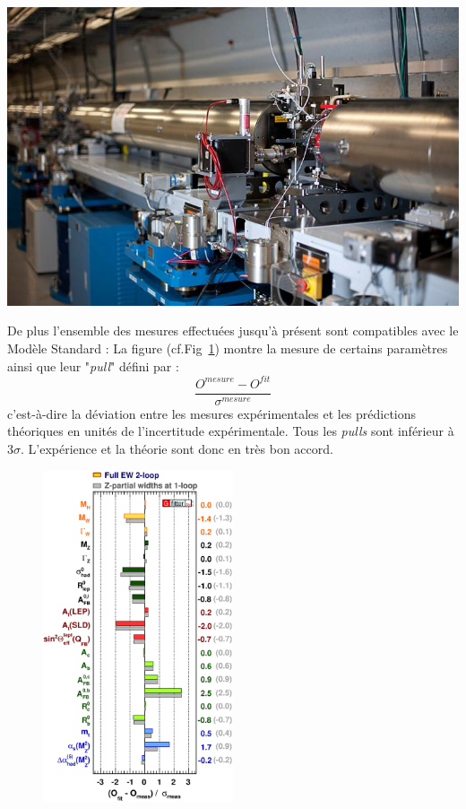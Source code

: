\marginpar
{
	\centering
	\includegraphics[width=\marginparwidth]{SM/slac.jpg}
	\label{SLAC}
}

De plus l'ensemble des mesures effectuées jusqu'à présent sont compatibles avec le Modèle Standard : La figure (cf.Fig~\ref{mesures}) montre la mesure de certains paramètres ainsi que leur "\textit{pull}" défini par :
\begin{equation}
\frac{O^{mesure}-O^{fit}}{\sigma^{mesure}}
\end{equation}
c'est-à-dire la déviation entre les mesures expérimentales et les prédictions théoriques en unités de l'incertitude expérimentale. Tous les \textit{pulls} sont inférieur à \num{3}$\sigma$. L'expérience et la théorie sont donc en très bon accord.

\begin{figure}[ht!]
\centering
\includegraphics[width=0.50\textwidth]{SM/mesure.eps}
\label{mesures}
\end{figure}

